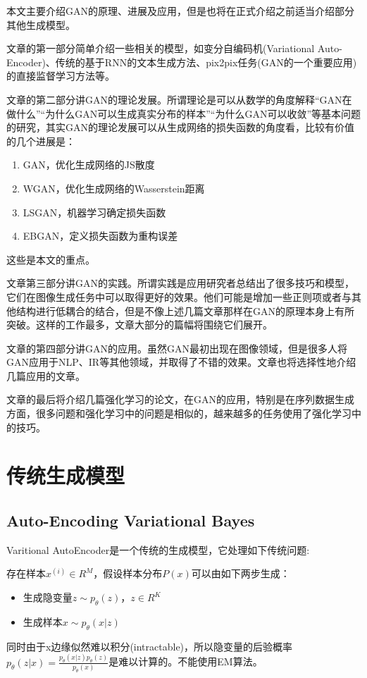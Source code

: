 \documentclass[a4paper]{article}
\begin{document}
本文主要介绍GAN的原理、进展及应用，但是也将在正式介绍之前适当介绍部分其他生成模型。

文章的第一部分简单介绍一些相关的模型，如变分自编码机(Variational Auto-Encoder)、传统的基于RNN的文本生成方法、pix2pix任务(GAN的一个重要应用)的直接监督学习方法等。

文章的第二部分讲GAN的理论发展。所谓理论是可以从数学的角度解释“GAN在做什么”“为什么GAN可以生成真实分布的样本”“为什么GAN可以收敛”等基本问题的研究，其实GAN的理论发展可以从生成网络的损失函数的角度看，比较有价值的几个进展是：
\begin{enumerate}
\item GAN，优化生成网络的JS散度
\item WGAN，优化生成网络的Wasserstein距离
\item LSGAN，机器学习确定损失函数
\item EBGAN，定义损失函数为重构误差
\end{enumerate}这些是本文的重点。

文章第三部分讲GAN的实践。所谓实践是应用研究者总结出了很多技巧和模型，它们在图像生成任务中可以取得更好的效果。他们可能是增加一些正则项或者与其他结构进行低耦合的结合，但是不像上述几篇文章那样在GAN的原理本身上有所突破。这样的工作最多，文章大部分的篇幅将围绕它们展开。

文章的第四部分讲GAN的应用。虽然GAN最初出现在图像领域，但是很多人将GAN应用于NLP、IR等其他领域，并取得了不错的效果。文章也将选择性地介绍几篇应用的文章。

文章的最后将介绍几篇强化学习的论文，在GAN的应用，特别是在序列数据生成方面，很多问题和强化学习中的问题是相似的，越来越多的任务使用了强化学习中的技巧。
\section{传统生成模型}
\subsection{Auto-Encoding Variational Bayes\cite{vae}}
Varitional AutoEncoder是一个传统的生成模型，它处理如下传统问题:

存在样本${x^{(i)}\in R^M}$，假设样本分布$P(x)$可以由如下两步生成：
\begin{itemize}

\item 生成隐变量$z\sim p_\theta(z)$，$z\in R^K$
\item 生成样本$x \sim p_\theta(x|z)$
\end{itemize}
同时由于x边缘似然难以积分(intractable)，所以隐变量的后验概率$p_{\theta}(z|x) = \frac{p_\theta(x|z)p_\theta(z)}{p_\theta(x)}$是难以计算的。不能使用EM算法。
\end{document}
